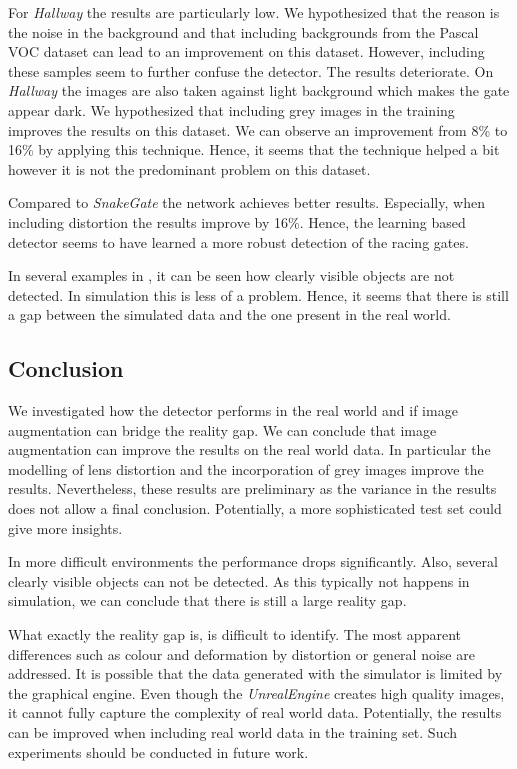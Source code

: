 For \textit{Hallway} the results are particularly low. We hypothesized that the reason is the noise in the background and that including backgrounds from the Pascal VOC dataset can lead to an improvement on this dataset. However, including these samples seem to further confuse the detector. The results deteriorate. On \textit{Hallway} the images are also taken against light background which makes the gate appear dark. We hypothesized that including grey images in the training improves the results on this dataset. We can observe an improvement from 8\% to 16\% by applying this technique. Hence, it seems that the technique helped a bit however it is not the predominant problem on this dataset.

Compared to \textit{SnakeGate} the network achieves better results. Especially, when including distortion the results improve by 16\%. Hence, the learning based detector seems to have learned a more robust detection of the racing gates.

In several examples in , it can be seen how clearly visible objects are not detected. In simulation this is less of a problem. Hence, it seems that there is still a gap between the simulated data and the one present in the real world.

\subsection{Conclusion}

We investigated how the detector performs in the real world and if image augmentation can bridge the reality gap. We can conclude that image augmentation can improve the results on the real world data. In particular the modelling of lens distortion and the incorporation of grey images improve the results. Nevertheless, these results are preliminary as the variance in the results does not allow a final conclusion. Potentially, a more sophisticated test set could give more insights.


In more difficult environments the performance drops significantly. Also, several clearly visible objects can not be detected. As this typically not happens in simulation, we can conclude that there is still a large reality gap.

What exactly the reality gap is, is difficult to identify. The most apparent differences such as colour and deformation by distortion or general noise are addressed. It is possible that the data generated with the simulator is limited by the graphical engine. Even though the \textit{UnrealEngine} creates high quality images, it cannot fully capture the complexity of real world data. Potentially, the results can be improved when including real world data in the training set. Such experiments should be conducted in future work.

